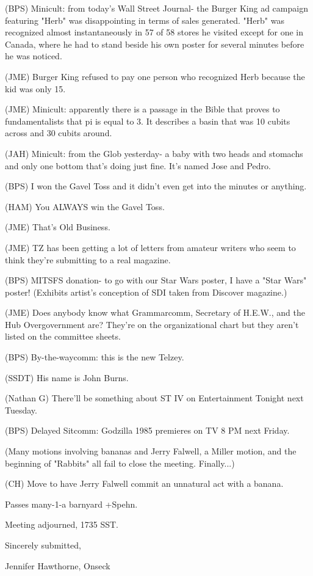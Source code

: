 \documentclass[12pt]{article}
\begin{document}
(BPS) Minicult: from today's Wall Street Journal- the Burger King ad campaign featuring "Herb" was disappointing in terms of sales generated. "Herb" was recognized almost instantaneously in 57 of 58 stores he visited except for one in Canada, where he had to stand beside his own poster for several minutes before he was noticed.

(JME) Burger King refused to pay one person who recognized Herb because the kid was only 15.

(JME) Minicult: apparently there is a passage in the Bible that proves to fundamentalists that pi is equal to 3. It describes a basin that was 10 cubits across and 30 cubits around.

(JAH) Minicult: from the Glob yesterday- a baby with two heads and stomachs and only one bottom that's doing just fine. It's named Jose and Pedro.

(BPS) I won the Gavel Toss and it didn't even get into the minutes or anything.

(HAM) You ALWAYS win the Gavel Toss.

(JME) That's Old Business.

(JME) TZ has been getting a lot of letters from amateur writers who seem to think they're submitting to a real magazine.

(BPS) MITSFS donation- to go with our Star Wars poster, I have a "Star Wars" poster! (Exhibits artist's conception of SDI taken from Discover magazine.)

(JME) Does anybody know what Grammarcomm, Secretary of H.E.W., and the Hub Overgovernment are? They're on the organizational chart but they aren't listed on the committee sheets.

(BPS) By-the-waycomm: this is the new Telzey.

(SSDT) His name is John Burns.

(Nathan G) There'll be something about ST IV on Entertainment Tonight next Tuesday.

(BPS) Delayed Sitcomm: Godzilla 1985 premieres on TV 8 PM next Friday.

(Many motions involving bananas and Jerry Falwell, a Miller motion, and the beginning of "Rabbits" all fail to close the meeting. Finally...)

(CH) Move to have Jerry Falwell commit an unnatural act with a banana.

Passes many-1-a barnyard +Spehn.

\vspace{12pt}

\noindent
Meeting adjourned, 1735 SST.

\vspace{18pt}

\centerline{Sincerely submitted,}
\centerline{Jennifer Hawthorne, Onseck}
\end{document}

